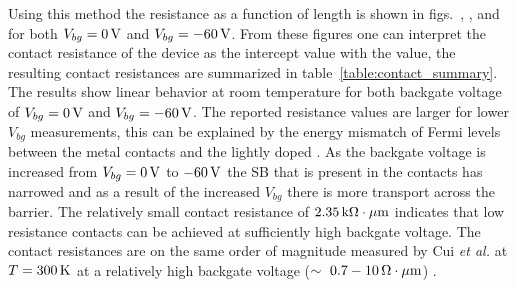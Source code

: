 Using this method the resistance as a function of length is shown in figs.~, , and  for both $V_{bg}=0\,\mathrm{V}$ and $V_{bg}=-60\,\mathrm{V}$. From these figures one can interpret the contact resistance of the device as the intercept value with the value, the resulting contact resistances are summarized in table~\ref{table:contact_summary}. The results show linear behavior at room temperature for both backgate voltage of $V_{bg}=0\,\mathrm{V}$ and $V_{bg}=-60\,\mathrm{V}$. The reported resistance values are larger for lower $V_{bg}$ measurements, this can be explained by the energy mismatch of Fermi levels between the metal contacts and the lightly doped . As the backgate voltage is increased from $V_{bg} = 0\,\mathrm{V}$ to $-60\,\mathrm{V}$ the \acs{SB} that is present in the contacts has narrowed and as a result of the increased $V_{bg}$ there is more transport across the barrier. The relatively small contact resistance of $2.35\,\mathrm{k\Omega\cdot\mu m}$ indicates that low resistance contacts can be achieved at sufficiently high backgate voltage. The contact resistances are on the same order of magnitude measured by Cui \emph{et al.} at $T=300\,\mathrm{K}$ at a relatively high backgate voltage ($\sim~0.7-10\,\mathrm{\Omega\cdot\mu m}$) \cite{Cui_NatureNano2015}.  \\ \\

